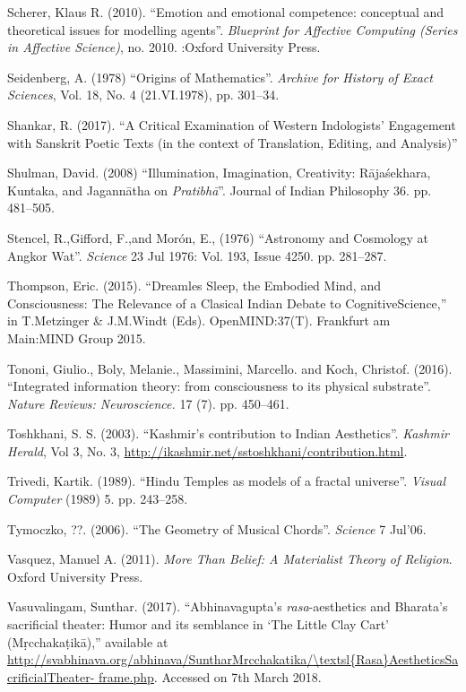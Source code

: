 \begin{thebibliography}{99}
Scherer, Klaus R. (2010). “Emotion and emotional competence: conceptual and theoretical issues for modelling agents”. \textsl{Blueprint for Affective Computing (Series in Affective Science)}, no. 2010. :Oxford University Press.

Seidenberg, A. (1978) “Origins of Mathematics”. \textsl{Archive for History of Exact Sciences}, Vol. 18, No. 4 (21.VI.1978), pp. 301--34.

Shankar, R. (2017). “A Critical Examination of Western Indologists’ Engagement with Sanskrit Poetic Texts (in the context of Translation, Editing, and Analysis)”

Shulman, David. (2008) “Illumination, Imagination, Creativity: Rājaśekhara, Kuntaka, and Jagannātha on \textsl{Pratibhā}”. Journal of Indian Philosophy 36. pp. 481--505.

Stencel, R.,Gifford, F.,and Morón, E., (1976) “Astronomy and Cosmology at Angkor Wat”. \textsl{Science} 23 Jul 1976: Vol. 193, Issue 4250. pp. 281--287.

Thompson, Eric. (2015). “Dreamles Sleep, the Embodied Mind, and Consciousness: The Relevance of a Clasical Indian Debate to CognitiveScience,” in T.Metzinger \& J.M.Windt (Eds). OpenMIND:37(T). Frankfurt am Main:MIND Group 2015.

Tononi, Giulio., Boly, Melanie., Massimini, Marcello. and Koch, Christof. (2016). “Integrated information theory: from consciousness to its physical substrate”. \textsl{Nature Reviews: Neuroscience.} 17 (7). pp. 450--461.

Toshkhani, S. S. (2003). “Kashmir’s contribution to Indian Aesthetics”. \textsl{Kashmir Herald}, Vol 3, No. 3, \url{http://ikashmir.net/sstoshkhani/contribution.html}.

Trivedi, Kartik. (1989). “Hindu Temples as models of a fractal universe”. \textsl{Visual Computer} (1989) 5. pp. 243--258.

Tymoczko, ??. (2006). “The Geometry of Musical Chords”. \textsl{Science} 7 Jul’06.

Vasquez, Manuel A. (2011). \textsl{More Than Belief: A Materialist Theory of Religion}. Oxford University Press.

Vasuvalingam, Sunthar. (2017). “Abhinavagupta’s \textsl{rasa}-aesthetics and Bharata’s sacrificial theater: Humor and its semblance in ‘The Little Clay Cart’ (Mṛcchakaṭikā),” available at \url{http://svabhinava.org/abhinava/SuntharMrcchakatika/\textsl{Rasa}AestheticsSacrificialTheater- frame.php}. Accessed on 7th March 2018.


\end{thebibliography}
